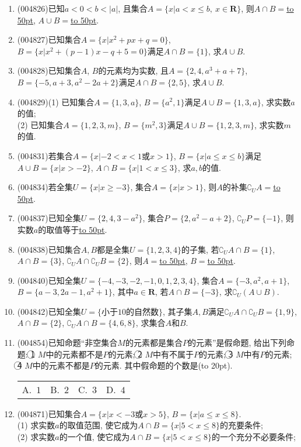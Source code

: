 \documentclass[10pt,a4paper]{article}
\newcommand{\blank}[1]{\underline{\hbox to #1pt{}}}
\newcommand{\bracket}[1]{(\hbox to #1pt{})}
\newcommand{\fourch}[4]{\par\begin{tabular}{p{.23\textwidth}p{.23\textwidth}p{.23\textwidth}p{.23\textwidth}}
A.~#1 &B.~#2& C.~#3& D.~#4
\end{tabular}}
\begin{document}
\begin{enumerate}[1.]
\item {\tiny (004826)}已知$a<0<b<|a|$, 且集合$A=\{x|a<x\le b, \ x\in \mathbf{R}\}$, 则$A\cap B=$\blank{50}, $A\cup B=$\blank{50}.
\item {\tiny (004827)}已知集合$A=\{x|x^2+px+q=0\}$, $B=\{x|x^2+(p-1)x-q+5=0\}$满足$A\cap B=\{1\}$, 求$A\cup B$.
\item {\tiny (004828)}已知集合$A$, $B$的元素均为实数, 且$A=\{2,4,a^3+a+7\}$, $B=\{-5,a+3,a^2-2a+2\}$满足$A\cap B=\{2,5\}$, 求$A\cup B$.
\item {\tiny (004829)}(1) 已知集合$A=\{1,3,a\}$, $B=\{a^2,1\}$满足$A\cup B=\{1,3,a\}$, 求实数$a$的值;\\
(2) 已知集合$A=\{1,2,3,m\}$, $B=\{m^2,3\}$满足$A\cup B=\{1,2,3,m\}$, 求实数$m$的值.
\item {\tiny (004831)}若集合$A=\{x|-2<x<1\text{或}x>1\}$, $B=\{x|a\le x\le b\}$满足$A\cup B=\{x|x>-2\}$, $A\cap B=\{x|1<x\le 3\}$, 求$a,b$的值.
\item {\tiny (004834)}若全集$U=\{x|x\ge -3\}$, 集合$A=\{x|x>1\}$, 则$A$的补集$\complement_UA=$\blank{50}.
\item {\tiny (004837)}已知全集$U=\{2,4,3-a^2\}$, 集合$P=\{2,a^2-a+2\}$, $\complement_UP=\{-1\}$, 则实数$a$的取值等于\blank{50}.
\item {\tiny (004838)}已知集合$A,B$都是全集$U=\{1,2,3,4\}$的子集, 若$\complement_UA\cap B=\{1\}$, $A\cap B=\{3\}$, $\complement_UA\cap \complement_UB=\{2\}$, 则$A=$\blank{50}, $B=$\blank{50}.
\item {\tiny (004840)}已知全集$U=\{-4,-3,-2,-1,0,1,2,3,4\}$, 集合$A=\{-3,a^2,a+1\}$, $B=\{a-3,2a-1,a^2+1\}$, 其中$a\in \mathbf{R}$, 若$A\cap B=\{-3\}$, 求$\complement_U(A\cup B)$.
\item {\tiny (004842)}已知全集$U=\{\text{小于}10\text{的自然数}\}$, 其子集$A,B$满足$\complement_UA\cap \complement_UB=\{1,9\}$, $A\cap B=\{2\}$, $\complement_UA\cap B=\{4,6,8\}$, 求集合$A$和$B$.
\item {\tiny (004854)}已知命题``非空集合$M$的元素都是集合$P$的元素''是假命题, 给出下列命题: \textcircled{1} $M$中的元素都不是$P$的元素; \textcircled{2} $M$中有不属于$P$的元素; \textcircled{3} $M$中有$P$的元素; \textcircled{4} $M$中的元素不都是$P$的元素. 其中假命题的个数是\bracket{20}.
\fourch{$1$}{$2$}{$3$}{$4$}
\item {\tiny (004871)}已知集合$A=\{x|x<-3\text{或}x>5\}$, $B=\{x|a\le x\le 8\}$.\\
(1) 求实数$a$的取值范围, 使它成为$A\cap B=\{x|5<x\le 8\}$的充要条件;\\
(2) 求实数$a$的一个值, 使它成为$A\cap B=\{x|5<x\le 8\}$的一个充分不必要条件;\\

\end{enumerate}
\end{document}
